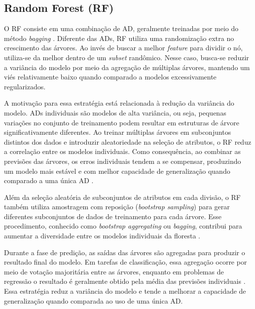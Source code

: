 \subsection{Random Forest (RF)}

O RF consiste em uma combinação de AD, geralmente treinadas por meio do método \textit{bagging} \cite{Geron2019}. Diferente das ADs, RF 
utiliza uma randomização extra no crescimento das árvores. Ao invés de buscar a melhor \textit{feature} para dividir o nó, 
utiliza-se da melhor dentro de um \textit{subset} randômico. Nesse caso, busca-se reduzir a variância do modelo por meio da agregação de 
múltiplas árvores, mantendo um viés relativamente baixo quando comparado a modelos excessivamente regularizados.

A motivação para essa estratégia está relacionada à redução da variância do modelo. ADs individuais são modelos de alta variância, 
ou seja, pequenas variações no conjunto de treinamento podem resultar em estruturas de árvore significativamente diferentes. Ao treinar múltiplas 
árvores em subconjuntos distintos dos dados e introduzir aleatoriedade na seleção de atributos, o RF reduz a correlação entre os modelos 
individuais. Como consequência, ao combinar as previsões das árvores, os erros individuais tendem a se compensar, produzindo um modelo mais estável 
e com melhor capacidade de generalização quando comparado a uma única AD \cite{Geron2019}.

Além da seleção aleatória de subconjuntos de atributos em cada divisão, o RF também utiliza amostragem com reposição (\textit{bootstrap sampling}) para 
gerar diferentes subconjuntos de dados de treinamento para cada árvore. Esse procedimento, conhecido como \textit{bootstrap aggregating} 
ou \textit{bagging}, contribui para aumentar a diversidade entre os modelos individuais da floresta \cite{Geron2019}. 

Durante a fase de predição, as saídas das árvores são agregadas para produzir o resultado final do modelo. Em tarefas de classificação, 
essa agregação ocorre por meio de votação majoritária entre as árvores, enquanto em problemas de regressão o resultado é geralmente obtido pela 
média das previsões individuais \cite{Geron2019}. Essa estratégia reduz a variância do modelo e tende a melhorar a capacidade de generalização quando comparada 
ao uso de uma única AD.

